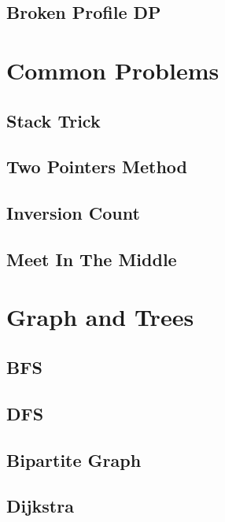 \subsection{Broken Profile DP}
\raggedbottom
\hrulefill

\section{Common Problems}
\subsection{Stack Trick}
\raggedbottom
\hrulefill
\subsection{Two Pointers Method}
\raggedbottom
\hrulefill
\subsection{Inversion Count}
\raggedbottom
\hrulefill
\subsection{Meet In The Middle}
\raggedbottom
\hrulefill

\section{Graph and Trees}
\subsection{BFS}
\raggedbottom
\hrulefill
\subsection{DFS}
\raggedbottom
\hrulefill
\subsection{Bipartite Graph}
\raggedbottom
\hrulefill
\subsection{Dijkstra}
\raggedbottom
\hrulefill
